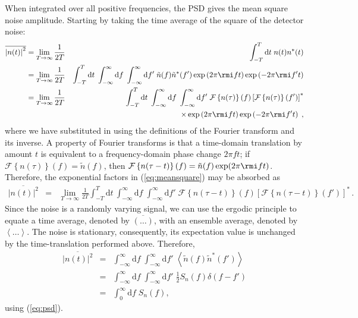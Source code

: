 When integrated over all positive frequencies, the PSD gives the mean square noise amplitude. Starting by taking the time average of the square of the detector noise:
\begin{eqnarray}
\overline{\left|n(t)\right|^{2}} &= \lim_{T\rightarrow\infty}\frac{1}{2T} & \int_{-T}^{T}\mathrm{d}t\; n(t)n^{*}(t) \\
 &= \lim_{T\rightarrow\infty}\frac{1}{2T} & \int_{-T}^{T}\mathrm{d}t\; \int_{-\infty}^{\infty}\mathrm{d}f\;\int_{-\infty}^{\infty}\mathrm{d}f'\;\tilde{n}(f)\tilde{n}^{*}(f')\exp\left(2\pi \rmi ft\right)\exp\left(-2\pi \rmi f't\right) \nonumber\\
 &= \lim_{T\rightarrow\infty}\frac{1}{2T} & \int_{-T}^{T}\mathrm{d}t\; \int_{-\infty}^{\infty}\mathrm{d}f\;\int_{-\infty}^{\infty}\mathrm{d}f'\;{\mathcal{F}}\left\{ n(\tau) \right\}(f)\left[{\mathcal{F}}\left\{ n(\tau) \right\}(f')\right]^{*} \nonumber \\*
\label{eq:meansquare} & & \times \exp\left(2\pi \rmi ft\right)\exp\left(-2\pi \rmi f't\right)\;,
\end{eqnarray}
where we have substituted in using the definitions of the Fourier transform and its inverse. A property of Fourier transforms is that a time-domain translation by amount $t$ is equivalent to a frequency-domain phase change $2\pi ft$; if ${\mathcal{F}}\left\{ n(\tau) \right\}(f) = \tilde{n}(f)$, then ${\mathcal{F}}\left\{ n(\tau-t) \right\}(f) = \tilde{n}(f)\exp (2\pi \rmi ft )$. Therefore, the exponential factors in (\ref{eq:meansquare}) may be absorbed as
\begin{eqnarray}
\overline{\left|n(t)\right|^{2}} &=& \lim_{T\rightarrow\infty}\frac{1}{2T}\int_{-T}^{T} \mathrm{d}t\:\int_{-\infty}^{\infty}\mathrm{d}f\;\int_{-\infty}^{\infty}\mathrm{d}f'\;{\mathcal{F}}\left\{ n(\tau-t) \right\}(f)\left[{\mathcal{F}}\left\{ n(\tau-t) \right\}(f')\right]^{*} \, .
\end{eqnarray}
Since the noise is a randomly varying signal, we can use the ergodic principle to equate a time average, denoted by $\overline{\left(\ldots\right)}$, with an ensemble average, denoted by $\left<\ldots\right>$. The noise is stationary, consequently, its expectation value is unchanged by the time-translation performed above. Therefore,
\begin{eqnarray}\label{eq:meansquare1}
\overline{\left|n(t)\right|^{2}} &=& \int_{-\infty}^{\infty}\mathrm{d}f\;\int_{-\infty}^{\infty}\mathrm{d}f'\;\left<\tilde{n}(f)\tilde{n}^{*}(f')\right> \\
&=& \int_{-\infty}^{\infty}\mathrm{d}f\;\int_{-\infty}^{\infty}\mathrm{d}f'\;\frac{1}{2}S_{n}(f)\delta(f-f') \nonumber \\
&=& \int_{0}^{\infty}\mathrm{d}f\; S_{n}(f),
\end{eqnarray}
using (\ref{eq:psd}).

